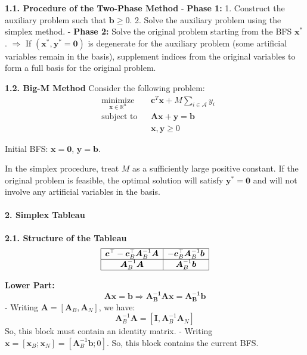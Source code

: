 \documentclass[11pt,a4paper]{article}
\begin{document}
\textbf{1.1. Procedure of the Two-Phase Method} - \textbf{Phase 1:} 1. Construct the auxiliary problem such that \(\boldsymbol{b} \geq 0\). 2. Solve the auxiliary problem using the simplex method. - \textbf{Phase 2:} Solve the original problem starting from the BFS \(\boldsymbol{x}^*\). \(\Rightarrow\) If \((\boldsymbol{x}^*, \boldsymbol{y}^* = \mathbf{0})\) is degenerate for the auxiliary problem (some artificial variables remain in the basis), supplement indices from the original variables to form a full basis for the original problem.

\textbf{1.2. Big-M Method} Consider the following problem: \[\begin{aligned}
& \underset{\boldsymbol{x} \in \mathbb{R}^n}{\text{minimize}} & & \boldsymbol{c}^T \boldsymbol{x} + M \sum_{i \in \mathcal{A}} y_i \\
& \text{subject to} & & \boldsymbol{A x} + \boldsymbol{y} = \boldsymbol{b} \\
& & & \boldsymbol{x}, \boldsymbol{y} \geq 0
\end{aligned}\]

Initial BFS: \(\boldsymbol{x} = \mathbf{0}\), \(\boldsymbol{y} = \boldsymbol{b}\).

In the simplex procedure, treat \(M\) as a sufficiently large positive constant. If the original problem is feasible, the optimal solution will satisfy \(\boldsymbol{y}^* = \mathbf{0}\) and will not involve any artificial variables in the basis.

\paragraph{2. Simplex Tableau}\label{simplex-tableau}

\textbf{2.1. Structure of the Tableau} \[
\begin{array}{|c|c|}
\hline \boldsymbol{c}^\top - \boldsymbol{c}_B^\top \boldsymbol{A}_B^{-1} \boldsymbol{A} & -\boldsymbol{c}_B^\top \boldsymbol{A}_B^{-1} \boldsymbol{b} \\
\hline \boldsymbol{A}_B^{-1} \boldsymbol{A} & \boldsymbol{A}_B^{-1} \boldsymbol{b} \\
\hline
\end{array}
\]

\textbf{Lower Part:} \[\boldsymbol{Ax} = \boldsymbol{b} \Rightarrow \boldsymbol{A_B^{-1} A x} = \boldsymbol{A_B^{-1} b}\] - Writing \(\boldsymbol{A} = [\boldsymbol{A}_B, \boldsymbol{A}_N]\), we have: \[\boldsymbol{A}_B^{-1} \boldsymbol{A} = [\mathbf{I}, \boldsymbol{A}_B^{-1} \boldsymbol{A}_N]\] So, this block must contain an identity matrix. - Writing \(\boldsymbol{x} = [\boldsymbol{x}_B; \boldsymbol{x}_N] = [\boldsymbol{A}_B^{-1} \boldsymbol{b}; 0]\). So, this block contains the current BFS.
\end{document}
